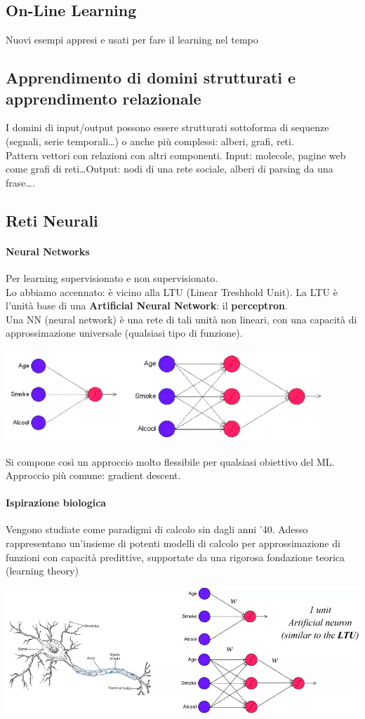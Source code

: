 \documentclass[10pt]{book}
\begin{document}
\subsection{On-Line Learning} Nuovi esempi appresi e usati per fare il learning nel tempo
\subsection{Apprendimento di domini strutturati e apprendimento relazionale}
I domini di input/output  possono essere strutturati sottoforma di sequenze (segnali, serie temporali\ldots) o anche più complessi: alberi, grafi, reti.\\
Pattern vettori con relazioni con altri componenti. Input: molecole, pagine web come grafi di reti\ldots Output: nodi di una rete sociale, alberi di parsing da una frase\ldots.
\subsection{Reti Neurali}
\paragraph{Neural Networks} Per learning supervisionato e non supervisionato.\\
Lo abbiamo accennato: è vicino alla LTU (Linear Treshhold Unit). La LTU è l'unità base di una \textbf{Artificial Neural Network}: il \textbf{perceptron}.\\
Una NN (neural network) è una rete di tali unità non lineari, con una capacità di approssimazione universale (qualsiasi tipo di funzione).
\begin{center}
	\includegraphics[scale=1]{nn.png}
\end{center}
Si compone così un approccio molto flessibile per qualsiasi obiettivo del ML. Approccio più comune: gradient descent.
\paragraph{Ispirazione biologica} Vengono studiate come paradigmi di calcolo sin dagli anni '40. Adesso rappresentano un'insieme di potenti modelli di calcolo per approssimazione di funzioni con capacità predittive, supportate da una rigorosa fondazione teorica (learning theory)
\begin{center}
	\includegraphics[scale=0.65]{nn2.png}
\end{center}
\end{document}
